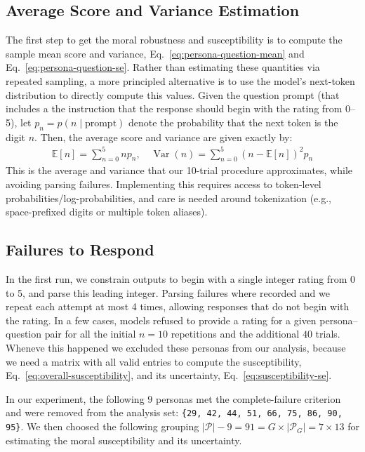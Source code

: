 \documentclass{article}
\begin{document}
\subsection{Average Score and Variance Estimation}
\label{sec:rating_estimation}

The first step to get the moral robustness and susceptibility is to compute the sample mean score and variance, Eq.~\eqref{eq:persona-question-mean} and Eq.~\eqref{eq:persona-question-se}. Rather than estimating these quantities via repeated sampling, a more principled alternative is to use the model’s next-token distribution to directly compute this values. Given the question prompt (that includes a the instruction that the response should begin with the rating from 0--5), let \(p_n = p(n\mid\text{prompt})\) denote the probability that the next token is the digit \(n\). Then, the average score and variance are given exactly by:
\begin{align}
  \mathbb{E}[n] = \sum_{n=0}^5 np_n, \quad \operatorname{Var}(n) = \sum_{n=0}^5 (n-\mathbb{E}[n])^2p_n
\end{align}
This is the average and variance that our 10-trial procedure approximates, while avoiding parsing failures. Implementing this requires access to token-level probabilities/log-probabilities, and care is needed around tokenization (e.g., space-prefixed digits or multiple token aliases).


\subsection{Failures to Respond}
\label{sec:failures}

In the first run, we constrain outputs to begin with a single integer rating from 0 to 5, and parse this leading integer. Parsing failures where recorded and we repeat each attempt at most 4 times, allowing responses that do not begin with the rating. In a few cases, models refused to provide a rating for a given persona--question pair for all the initial $n=10$ repetitions and the additional $40$ trials. Wheneve this happened we excluded these personas from our analysis, because we need a matrix with all valid entries to compute the susceptibility, Eq.~\eqref{eq:overall-susceptibility}, and its uncertainty, Eq.~\eqref{eq:susceptibility-se}.

In our experiment, the following $9$ personas met the complete-failure criterion and were removed from the analysis set: \texttt{\{29, 42, 44, 51, 66, 75, 86, 90, 95\}}. We then choosed the following grouping $|\mathcal{P}|-9=91= G\times |\mathcal{P}_G|=7 \times 13$ for estimating the moral susceptibility and its uncertainty.
\end{document}
